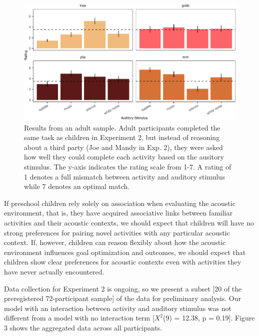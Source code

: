 \documentclass[10pt, letterpaper]{article}
\newenvironment{CodeChunk}{}{}
\begin{document}
\begin{CodeChunk}
\begin{figure}[t]

{\centering \includegraphics{figs/e4a-bar-1} 

}

\caption[Results from an adult sample]{Results from an adult sample. Adult participants completed the same task as children in Experiment 2, but instead of reasoning about a third party (Joe and Mandy in Exp. 2), they were asked how well they could complete each activity based on the ausitory stimulus. The y-axis indicates the rating scale from 1-7. A rating of 1 denotes a full mismatch between activity and auditory stimulus while 7 denotes an optimal match.}\label{fig:e4a-bar}
\end{figure}
\end{CodeChunk}

If preschool children rely solely on association when evaluating the
acoustic environment, that is, they have acquired associative links
between familiar activities and their acoustic contexts, we should
expect that children will have no strong preferences for pairing novel
activities with any particular acoustic context. If, however, children
can reason flexibly about how the acoustic environment influences goal
optimization and outcomes, we should expect that children show clear
preferences for acoustic contexts even with activities they have never
actually encountered.

Data collection for Experiment 2 is ongoing, so we present a subset
{[}20 of the preregistered 72-participant sample{]} of the data for
preliminary analysis. Our model with an interaction between activity and
auditory stimulus was not different from a model with no interaction
term {[}\(X^2\)(9) = 12.38, p = 0.19{]}. Figure 3 shows the aggregated
data across all participants.
\end{document}
